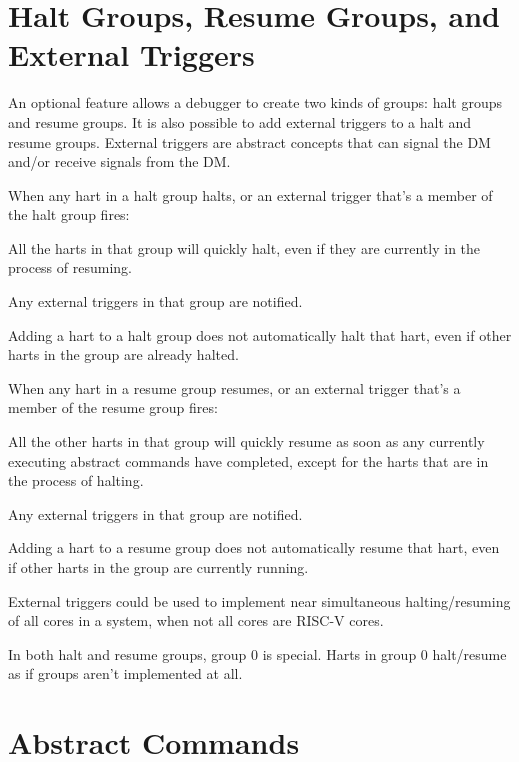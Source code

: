 \section{Halt Groups, Resume Groups, and External Triggers}

An optional feature allows a debugger to create two kinds of groups: halt
groups and resume groups.  It is also possible to add external triggers to a
halt and resume groups.  External triggers are abstract concepts that can
signal the DM and/or receive signals from the DM.

\begin{steps}{When any hart in a halt group halts, or an external trigger
    that's a member of the halt group fires:}
\item All the harts in that group will quickly halt, even if they are currently
    in the process of resuming.
\item Any external triggers in that group are notified.
\end{steps}
Adding a hart to a halt group does not automatically halt that hart, even if
other harts in the group are already halted.

\begin{steps}{When any hart in a resume group resumes, or an external trigger
    that's a member of the resume group fires:}
\item All the other harts in that group will quickly resume as soon as any
    currently executing abstract commands have completed, except for the harts
    that are in the process of halting.
\item Any external triggers in that group are notified.
\end{steps}
Adding a hart to a resume group does not automatically resume that hart, even
if other harts in the group are currently running.

\begin{commentary}
    External triggers could be used to implement near simultaneous
    halting/resuming of all cores in a system, when not all cores are RISC-V
    cores.
\end{commentary}

In both halt and resume groups, group 0 is special. Harts in group 0
halt/resume as if groups aren't implemented at all.

\section{Abstract Commands} \label{abstractcommands}

